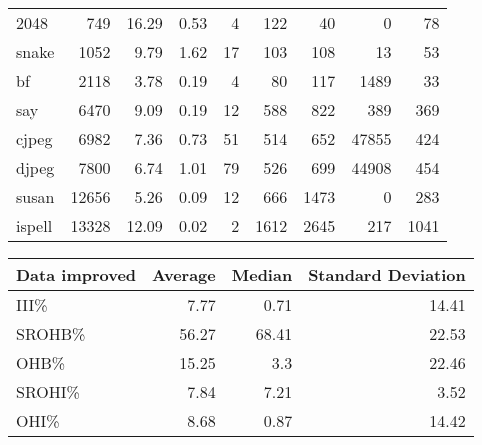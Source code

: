 \begin{tabular}{lrrrrrrrr}
 2048            &            749 &    16.29 &   0.53 &    4 &    122 &           40 &     0 &    78 \\
 snake           &           1052 &     9.79 &   1.62 &   17 &    103 &          108 &    13 &    53 \\
 bf              &           2118 &     3.78 &   0.19 &    4 &     80 &          117 &  1489 &    33 \\
 say             &           6470 &     9.09 &   0.19 &   12 &    588 &          822 &   389 &   369 \\
 cjpeg           &           6982 &     7.36 &   0.73 &   51 &    514 &          652 & 47855 &   424 \\
 djpeg           &           7800 &     6.74 &   1.01 &   79 &    526 &          699 & 44908 &   454 \\
 susan           &          12656 &     5.26 &   0.09 &   12 &    666 &         1473 &     0 &   283 \\
 ispell          &          13328 &    12.09 &   0.02 &    2 &   1612 &         2645 &   217 &  1041 \\
\hline
\end{tabular}\begin{tabular}{lrrr}
\hline
 Data improved   &   Average &   Median &   Standard Deviation \\
\hline
 III\%            &      7.77 &     0.71 &                14.41 \\
 SROHB\%          &     56.27 &    68.41 &                22.53 \\
 OHB\%            &     15.25 &     3.3  &                22.46 \\
 SROHI\%          &      7.84 &     7.21 &                 3.52 \\
 OHI\%            &      8.68 &     0.87 &                14.42 \\
\hline
\end{tabular}